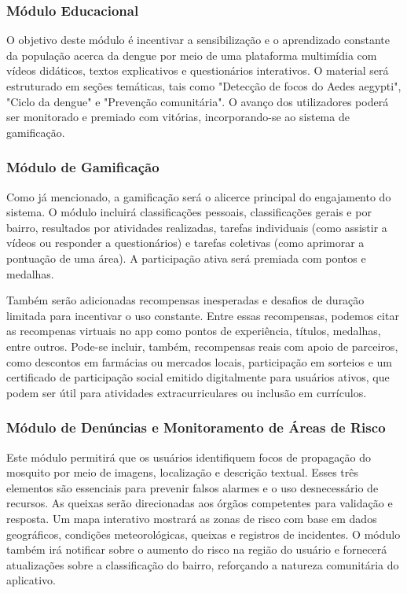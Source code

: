 \documentclass[a4paper, 12pt]{article}
\begin{document}
\subsubsection{Módulo Educacional}

O objetivo deste módulo é incentivar a sensibilização e o aprendizado constante da população acerca da dengue por meio de uma plataforma multimídia com vídeos didáticos, textos explicativos e questionários interativos.  O material será estruturado em seções temáticas, tais como "Detecção de focos do Aedes aegypti", "Ciclo da dengue" e "Prevenção comunitária".  O avanço dos utilizadores poderá ser monitorado e premiado com vitórias, incorporando-se ao sistema de gamificação.

\subsubsection{Módulo de Gamificação}

Como já mencionado, a gamificação será o alicerce principal do engajamento do sistema.  O módulo incluirá classificações pessoais, classificações gerais e por bairro, resultados por atividades realizadas, tarefas individuais (como assistir a vídeos ou responder a questionários) e tarefas coletivas (como aprimorar a pontuação de uma área).  A participação ativa será premiada com pontos e medalhas.  
\par Também serão adicionadas recompensas inesperadas e desafios de duração limitada para incentivar o uso constante. Entre essas recompensas, podemos citar as recompenas virtuais no app como pontos de experiência, títulos, medalhas, entre outros. Pode-se incluir, também, recompensas reais com apoio de parceiros, como descontos em farmácias ou mercados locais, participação em sorteios e um certificado de participação social emitido digitalmente para usuários ativos, que podem ser útil para atividades extracurriculares ou inclusão em currículos.

\subsubsection{Módulo de Denúncias e Monitoramento de Áreas de Risco}

Este módulo permitirá que os usuários identifiquem focos de propagação do mosquito por meio de imagens, localização e descrição textual. Esses três elementos são essenciais para prevenir falsos alarmes e o uso desnecessário de recursos.   As queixas serão direcionadas aos órgãos competentes para validação e resposta.   Um mapa interativo mostrará as zonas de risco com base em dados geográficos, condições meteorológicas, queixas e registros de incidentes.   O módulo também irá notificar sobre o aumento do risco na região do usuário e fornecerá atualizações sobre a classificação do bairro, reforçando a natureza comunitária do aplicativo.
\end{document}
